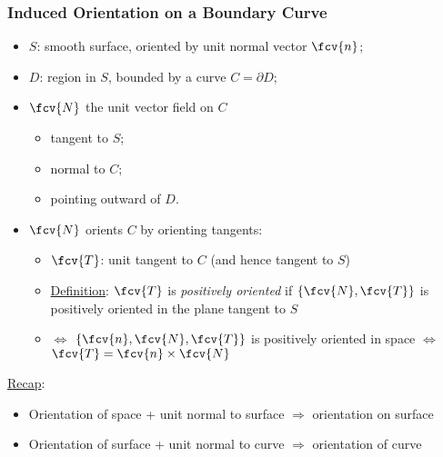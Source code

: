 \begin{frame}
  \frametitle{Induced Orientation on a Boundary Curve}
  \begin{itemize}
    \item $S$: smooth surface, oriented by unit normal vector $\fcv{n}$;
    \item $D$: region in $S$, bounded by a curve $C=\partial D$;
    \item $\fcv{N}$ the unit vector field on $C$
    \begin{itemize}
      \item tangent to $S$;
      \item normal to $C$;
      \item pointing outward of $D$.
    \end{itemize}
    \item \pause $\fcv{N}$ orients $C$ by orienting tangents:
    \begin{itemize}
      \item $\fcv{T}$: unit tangent to $C$ (and hence tangent to $S$)
      \item \underline{Definition}: $\fcv{T}$ is \emph{positively oriented} if $\{\fcv{N}, \fcv{T}\}$ is positively oriented in the plane tangent to $S$
      \item $\Leftrightarrow$ $\{\fcv{n}, \fcv{N}, \fcv{T}\}$ is positively oriented in space $\Leftrightarrow$ $\fcv{T}=\fcv{n}\times \fcv{N}$
    \end{itemize}
  \end{itemize}

\pause \underline{Recap}:
\begin{itemize}
  \item Orientation of space + unit normal to surface $\Rightarrow$ orientation on surface
  \item Orientation of surface + unit normal to curve $\Rightarrow$ orientation of curve
\end{itemize}
\end{frame}